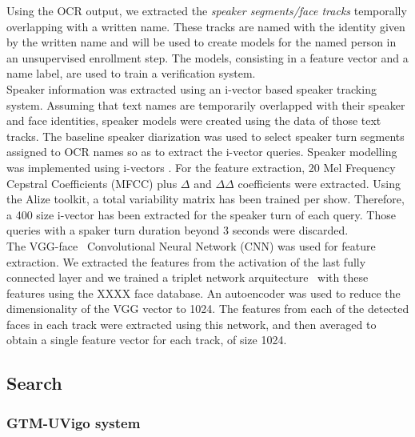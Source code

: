 Using the OCR output, we extracted the \textit{speaker segments/face tracks} temporally overlapping with a written name. These tracks are named with the identity given by the written name and will be used to create models for the named person in an unsupervised enrollment step. The models, consisting in a feature vector and a name label, are used to train a verification system.\\

Speaker information was extracted using an i-vector based speaker tracking system. Assuming that text names are temporarily overlapped with their speaker and face identities, speaker models were created using the data of those text tracks. The baseline speaker diarization was used to select speaker turn segments assigned to OCR names so as to extract the i-vector queries. Speaker modelling was implemented using i-vectors \cite{Dehak}. For the feature extraction, 20 Mel Frequency Cepstral Coefficients (MFCC) plus $\Delta$ and $\Delta\Delta$  coefficients were extracted. Using the Alize  toolkit\cite{Bonastre1,Bonastre2}, a total variability matrix has been trained per show. Therefore, a 400 size i-vector has been extracted for the speaker turn of each query. Those queries with a spaker turn duration beyond 3 seconds were discarded.\\

The VGG-face~\cite{Simonyan14c} Convolutional Neural Network (CNN) was used for feature extraction. We extracted the features from the activation of the last fully connected layer and we trained a triplet network arquitecture~\cite{parkhi15deep} with these features using the XXXX face database. An autoencoder was used to reduce the dimensionality of the VGG vector to 1024. 
The features from each of the detected faces in each track were extracted using this network, and then averaged to obtain a single feature vector for each track, of size 1024.\\

\subsection{Search}

\subsubsection{GTM-UVigo system}

